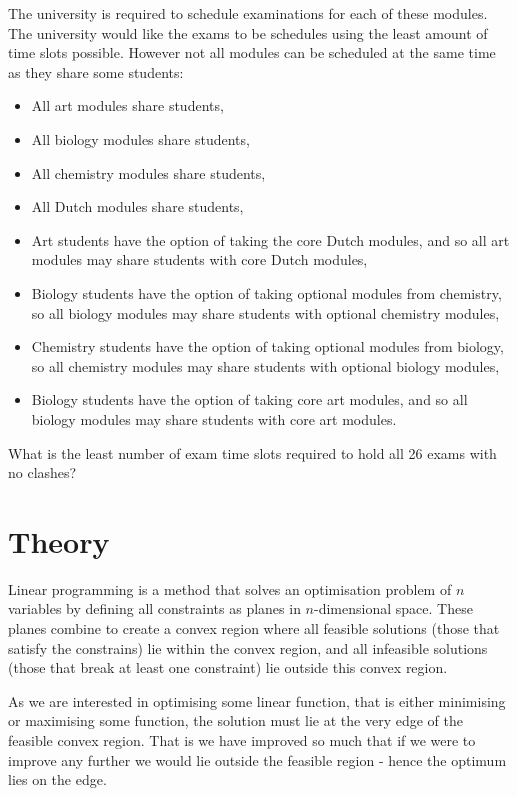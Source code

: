 The university is required to schedule examinations for each of these modules.
The university would like the exams to be schedules using the least amount of
time slots possible. However not all modules can be scheduled at the same time
as they share some students:

\begin{itemize}
  \item All art modules share students,
  \item All biology modules share students,
  \item All chemistry modules share students,
  \item All Dutch modules share students,
  \item Art students have the option of taking the core Dutch modules, and so
  all art modules may share students with core Dutch modules,
  \item Biology students have the option of taking optional modules from
  chemistry, so all biology modules may share students with optional chemistry
  modules,
  \item Chemistry students have the option of taking optional modules from
  biology, so all chemistry modules may share students with optional biology
  modules,
  \item Biology students have the option of taking core art modules, and so all
  biology modules may share students with core art modules.
\end{itemize}

What is the least number of exam time slots required to hold all 26 exams with
no clashes?


\section{Theory}\label{sec:theory}
Linear programming is a method that solves an optimisation problem of $n$
variables by defining all constraints as planes in $n$-dimensional space. These
planes combine to create a convex region where all feasible solutions (those
that satisfy the constrains) lie within the convex region, and all infeasible
solutions (those that break at least one constraint) lie outside this convex
region.

As we are interested in optimising some linear function, that is either
minimising or maximising some function, the solution must lie at the very edge
of the feasible convex region. That is we have improved so much that if we were
to improve any further we would lie outside the feasible region - hence the
optimum lies on the edge.

